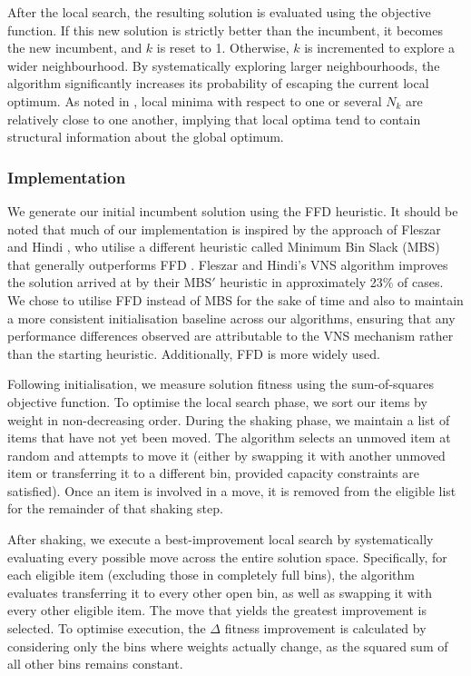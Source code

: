\documentclass[11pt]{article}
\begin{document}
After the local search, the resulting solution is evaluated using the objective function. If this new solution is strictly better than the incumbent, it becomes the new incumbent, and $k$ is reset to 1. Otherwise, $k$ is incremented to explore a wider neighbourhood. By systematically exploring larger neighbourhoods, the algorithm significantly increases its probability of escaping the current local optimum. As noted in \cite{gendreau}, local minima with respect to one or several $N_{k}$ are relatively close to one another, implying that local optima tend to contain structural information about the global optimum.

\subsubsection{Implementation}
We generate our initial incumbent solution using the FFD heuristic. It 
should be noted that much of our implementation is inspired by the approach 
of Fleszar and Hindi \cite{kryz}, who utilise a different heuristic called 
Minimum Bin Slack (MBS) that generally outperforms FFD \cite{gupta}. 
Fleszar and Hindi's VNS algorithm improves the solution arrived at by their 
$\mathrm{MBS}'$ heuristic in approximately 23\% of cases. We
chose to utilise FFD instead of MBS for the sake of time and also to maintain a more consistent 
initialisation baseline across our algorithms, ensuring that any performance 
differences observed are attributable to the VNS mechanism rather than the 
starting heuristic. Additionally, FFD is more widely used.

Following initialisation, we measure solution fitness using the sum-of-squares 
objective function. To optimise the local search phase, we sort our items by 
weight in non-decreasing order. During the shaking phase, we maintain a list 
of items that have not yet been moved. The algorithm selects an unmoved item 
at random and attempts to move it (either by swapping it with another unmoved 
item or transferring it to a different bin, provided capacity constraints are 
satisfied). Once an item is involved in a move, it is removed from the 
eligible list for the remainder of that shaking step.

After shaking, we execute a best-improvement local search by systematically 
evaluating every possible move across the entire solution space. Specifically, 
for each eligible item (excluding those in completely full bins), the algorithm 
evaluates transferring it to every other open bin, as well as swapping it with 
every other eligible item. The move that yields the greatest improvement is 
selected. To optimise execution, the $\Delta$ fitness improvement is 
calculated by considering only the bins where weights actually change, as the 
squared sum of all other bins remains constant.
\end{document}
